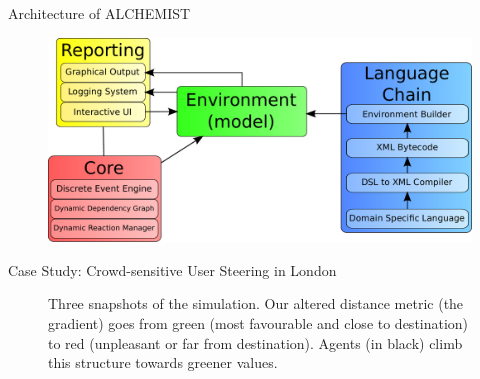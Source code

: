 \documentclass[presentation]{beamer} %
\newcommand{\alchemist}{{\sf ALCHEMIST}}
\begin{document}
\begin{frame}{Architecture of \alchemist{}}
  \begin{figure}
    \includegraphics[width=\textwidth]{imgs/architecture} 
  \end{figure}
\end{frame}

\begin{frame}{Case Study: Crowd-sensitive User Steering in London}
\begin{figure}[bt]\centering
  \caption{Three snapshots of the simulation. Our altered distance metric (the gradient) goes from green (most favourable and close to destination) to red (unpleasant or far from destination). Agents (in black) climb this structure towards greener values.}
\end{figure}

\end{frame}
\end{document}
